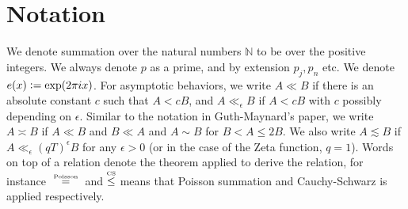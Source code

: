 \section*{Notation}
We denote summation over the natural numbers $\mathbb{N}$ to be over the positive integers. We always denote $p$ as a prime, and by extension $p_j,p_n$ etc. We denote $e(x)\mathrel{\mathop:}= \exp(2\pi i x)$. For asymptotic behaviors, we write $A\ll B$ if there is an absolute constant $c$ such that $A<cB$, and $A\ll_{\epsilon} B$ if $A<cB$ with $c$ possibly depending on $\epsilon$. Similar to the notation in Guth-Maynard's paper, we write $A\asymp B$ if $A\ll B$ and $B\ll A$ and $A\sim B$ for $B< A\leq 2B$. We also write $A\lesssim B$ if $A\ll_{\epsilon} (qT)^\epsilon B$ for any $\epsilon>0$ (or in the case of the Zeta function, $q=1$). Words on top of a relation denote the theorem applied to derive the relation, for instance $\quad\stackeq{Poisson}\quad$ and $\stackon{CS}{\leq}$ means that Poisson summation and Cauchy-Schwarz is applied respectively.
